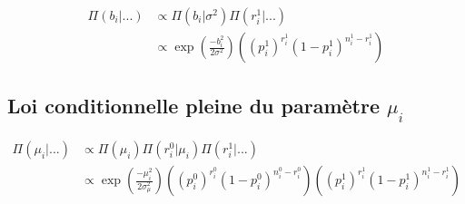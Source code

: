 \documentclass[
]{article}
\begin{document}
\begin{align*}
\Pi(b_i|...) &\propto \Pi(b_i|\sigma^2) \Pi(r_i^1|...) \\
&\propto \exp\left({\frac{-b_i^2}{2\sigma^2}}\right) \left((p_i^1)^{r_i^1}(1-p_i^1)^{n_i^1-r_i^1}\right)
\end{align*}

\hypertarget{loi-conditionnelle-pleine-du-paramuxe8tre-mu_i}{%
\subsection{\texorpdfstring{Loi conditionnelle pleine du paramètre
\(\mu_i\)}{Loi conditionnelle pleine du paramètre \textbackslash mu\_i}}\label{loi-conditionnelle-pleine-du-paramuxe8tre-mu_i}}

\begin{align*}
\Pi(\mu_i|...) &\propto \Pi(\mu_i)\Pi(r_i^0|\mu_i)\Pi(r_i^1|...) \\
&\propto \exp\left({\frac{-\mu_i^2}{2\sigma_{\mu}^2}}\right)\left((p_i^0)^{r_i^0}(1-p_i^0)^{n_i^0-r_i^0}\right)\left((p_i^1)^{r_i^1}(1-p_i^1)^{n_i^1-r_i^1}\right)
\end{align*}
\end{document}
